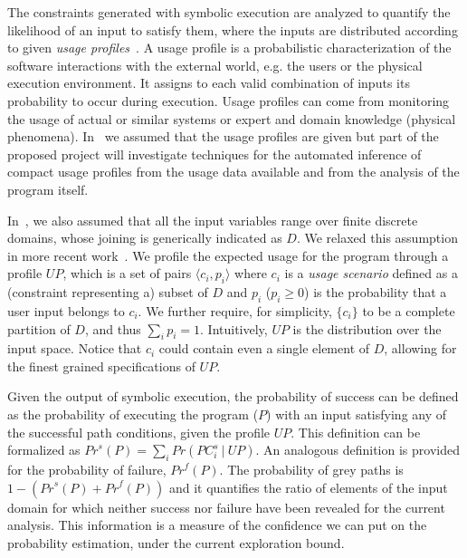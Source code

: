 The constraints generated with symbolic execution are analyzed to
quantify the likelihood of an input to satisfy them, where the inputs
are distributed according to given {\em usage
profiles}~\cite{filieri-etal-icse2013}. A usage profile is a probabilistic
characterization of the software interactions with the external world,
e.g. the users or the physical execution environment.  It assigns to
each valid combination of inputs its probability to occur during
 execution. 
Usage profiles can come from monitoring the usage of
 actual or similar systems or expert and domain knowledge (physical
 phenomena). 
In~\cite{filieri-etal-icse2013} we assumed that the usage profiles
are given but part of the proposed project will investigate techniques for the 
automated inference of compact usage profiles from the usage data 
available and from the analysis of the program itself.

In~\cite{filieri-etal-icse2013}, we also assumed that all the input variables
range over finite discrete domains, whose joining is generically
indicated as $D$. We relaxed this assumption in more recent work~\cite{Borges2014PLDI}. We profile the expected usage for the program through a profile
$\textit{UP}$, which is a set of pairs $\langle
c_i, p_i \rangle$ where $c_i$ is a \emph{usage scenario} defined as a
(constraint representing a) subset of $D$ and $p_i$ ($p_i\geq 0$) is
the probability that a user input belongs to $c_i$. We further
require, for simplicity, $\{c_i\}$ to be a complete partition of $D$,
and thus $\sum_i p_i=1$. Intuitively, $UP$ is the distribution over
the input space. Notice that $c_i$ could contain even a single element
of $D$, allowing for the finest grained specifications of
$\textit{UP}$.

Given the output of symbolic execution, the probability of success can
be defined as the probability of executing the program ($P$) with
an input satisfying any of the successful path conditions, given the
profile $UP$. This definition can be formalized as
$\textit{Pr}^s(P)=\sum_{i} \textit{Pr}(\textit{PC}_i^s \ | \ \textit{UP})$.
An analogous definition is provided for the probability of failure,
$\textit{Pr}^f(P)$. The probability of grey paths is $1-(\textit{Pr}^s(P)+\textit{Pr}^f(P))$ and it
quantifies the ratio of elements
of the input domain for which neither success nor failure have been
revealed for the current analysis. This information is a measure of
the confidence we can put on the probability estimation, under
the current exploration bound.


